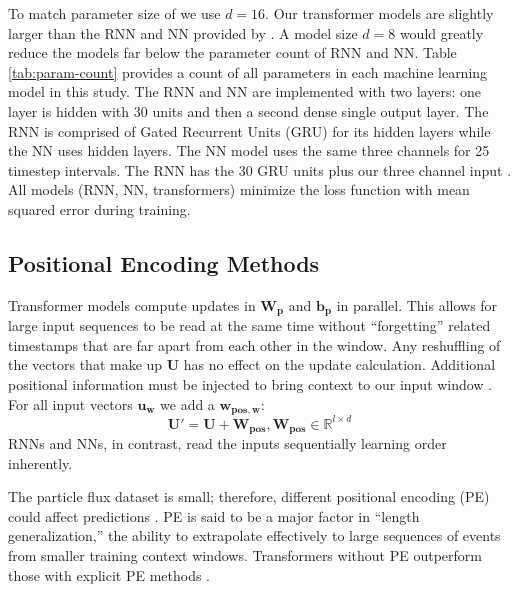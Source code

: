 

To match parameter size of  we use $d = 16$. Our transformer models are slightly larger than the RNN and NN provided by . A model size $d=8$ would 
greatly reduce the models far below the parameter count of RNN and NN.  Table \ref{tab:param-count} provides
a count of all parameters in each machine learning model in this study.
The RNN and NN are implemented  with two layers: one layer is hidden with 30 units and then a second dense single output layer.
The RNN is comprised of  Gated Recurrent Units (GRU) for its  hidden layers while the NN uses hidden layers.
The NN model uses the same three channels for 25 timestep intervals.
The RNN  has the 30 GRU units plus our three channel input \cite{torres2025machine}. 
All models (RNN, NN, transformers) minimize the loss function with mean squared error during training.


\subsection{Positional Encoding Methods}
\label{sec:positionalencodingmethods}

Transformer models compute updates in $\mathbf{W_p}$ and $\mathbf{b_p}$ in parallel. This allows for large input sequences
to be read at the same time without ``forgetting'' related timestamps that are far apart from each other in the window.  
Any reshuffling of the vectors that make  up $\mathbf{U}$ has no effect on the update calculation. 
Additional positional information must be injected to bring  context to our input window \cite{vaswani2017attention}.
For all input vectors $\mathbf{u_w}$ we add a $\mathbf{w_{\text{pos}, w}}$:
$$
\mathbf{U' = U + W_{\text{pos}}} , \mathbf{W_\text{pos}} \in \mathbb{R}^{l \times d}
$$
RNNs and NNs, in contrast, read the inputs sequentially learning order inherently.

The particle flux dataset is small; therefore, different positional encoding (PE) could affect predictions \cite{zhao2026transformersurvey}.
PE is said to be a major factor in ``length generalization,'' the ability to extrapolate effectively to large sequences of events
from smaller training context windows. Transformers without PE outperform those with explicit PE methods \cite{kazemnejad2023impact}. 

